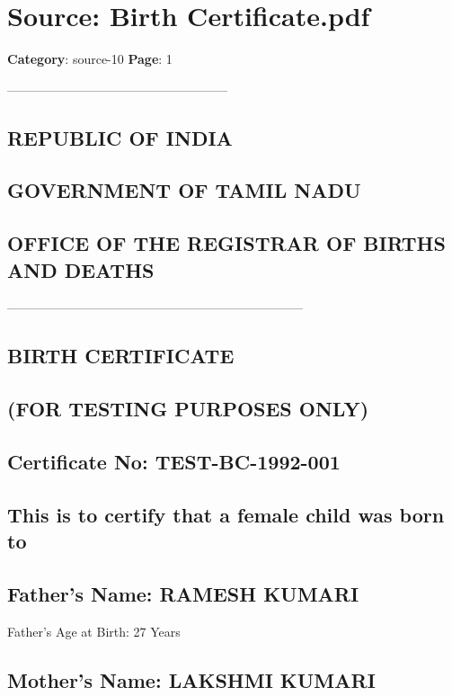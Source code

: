 \section*{Source: Birth Certificate.pdf}
\textbf{Category}: source-10
\textbf{Page}: 1

-----------------------------------------------------

\subsection*{REPUBLIC OF INDIA}

\subsection*{GOVERNMENT OF TAMIL NADU}

\subsection*{OFFICE OF THE REGISTRAR OF BIRTHS AND DEATHS}

-----------------------------------------------------------------------

\subsection*{BIRTH CERTIFICATE}

\subsection*{(FOR TESTING PURPOSES ONLY)}

\subsection*{Certificate No: TEST-BC-1992-001}

\subsection*{This is to certify that a female child was born to}

\subsection*{Father's Name: RAMESH KUMARI}

Father's Age at Birth: 27 Years

\subsection*{Mother's Name: LAKSHMI KUMARI}

